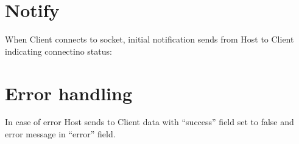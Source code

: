 \documentclass[letterpaper,10pt,english]{sphinxmanual}
\begin{document}
%
\begin{sphinxVerbatim}[commandchars=\\\{\}]
\end{sphinxVerbatim}


\section{Notify}
\label{\detokenize{bdsm:notify}}\label{\detokenize{bdsm:notify}}
When Client connects to socket, initial notification sends from Host to Client indicating connectino status:

%
\begin{sphinxVerbatim}[commandchars=\\\{\}]
\end{sphinxVerbatim}


\section{Error handling}
\label{\detokenize{bdsm:error-handling}}\label{\detokenize{bdsm:error-handling}}
In case of error Host sends to Client data with “success” field set to false and error message in “error” field.
\end{document}
